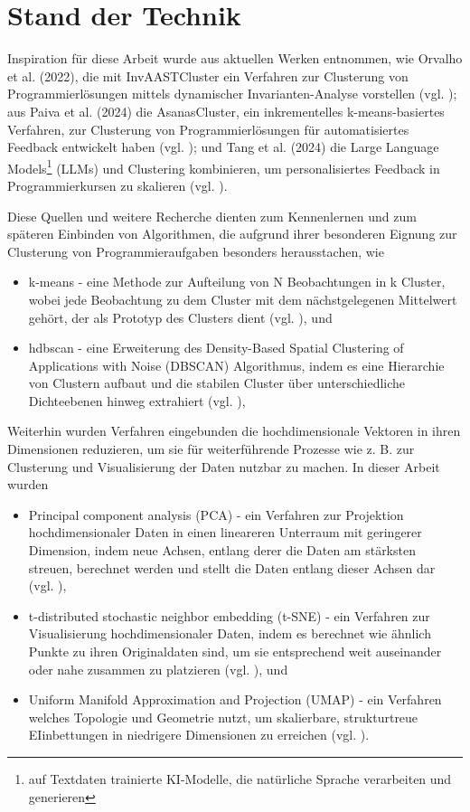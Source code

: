 \section{Stand der Technik}
Inspiration für diese Arbeit wurde aus aktuellen Werken entnommen, wie Orvalho et al. (2022), die mit InvAASTCluster ein Verfahren zur Clusterung von Programmierlösungen mittels dynamischer Invarianten-Analyse vorstellen (vgl. \cite{Orvalho.28.06.2022}); aus Paiva et al. (2024) die AsanasCluster, ein inkrementelles k-means-basiertes Verfahren, zur Clusterung von Programmierlösungen für automatisiertes Feedback entwickelt haben (vgl. \cite{Paiva.2024}); und Tang et al. (2024) die Large Language Models\footnote{auf Textdaten trainierte KI-Modelle, die natürliche Sprache verarbeiten und generieren} (LLMs) und Clustering kombinieren, um personalisiertes Feedback in Programmierkursen zu skalieren (vgl. \cite{Tang.21.10.2024}).

Diese Quellen und weitere Recherche dienten zum Kennenlernen und zum späteren Einbinden von Algorithmen, die aufgrund ihrer besonderen Eignung zur Clusterung von Programmieraufgaben besonders herausstachen, wie 
\begin{itemize}
    \item k-means - eine Methode zur Aufteilung von N Beobachtungen in k Cluster, wobei jede Beobachtung zu dem Cluster mit dem nächstgelegenen Mittelwert gehört, der als Prototyp des Clusters dient (vgl. \cite{MacQueen.1967}), und
    \item hdbscan - eine Erweiterung des Density-Based Spatial Clustering of Applications with Noise (DBSCAN) Algorithmus, indem es eine Hierarchie von Clustern aufbaut und die stabilen Cluster über unterschiedliche Dichteebenen hinweg extrahiert (vgl. \cite{CampelloRicardoJ.G.B..}),
\end{itemize}
Weiterhin wurden Verfahren eingebunden die hochdimensionale Vektoren in ihren Dimensionen reduzieren, um sie für weiterführende Prozesse wie z. B. zur Clusterung und Visualisierung der Daten nutzbar zu machen. In dieser Arbeit wurden
\begin{itemize}
    \item Principal component analysis (PCA) - ein Verfahren zur Projektion hochdimensionaler Daten in einen lineareren Unterraum mit geringerer Dimension, indem neue Achsen, entlang derer die Daten am stärksten streuen, berechnet werden und stellt die Daten entlang dieser Achsen dar (vgl. \cite{KarlPearson.1901}),
    \item t-distributed stochastic neighbor embedding (t-SNE) - ein Verfahren zur Visualisierung hochdimensionaler Daten, indem es berechnet wie ähnlich Punkte zu ihren Originaldaten sind, um sie entsprechend weit auseinander oder nahe zusammen zu platzieren (vgl. \cite{LaurensvanderMaatenundGeoffreyHinton.2008}), und
    \item Uniform Manifold Approximation and Projection (UMAP) - ein Verfahren welches Topologie und Geometrie nutzt, um skalierbare, strukturtreue EIinbettungen in niedrigere Dimensionen zu erreichen (vgl. \cite{McInnes.09.02.2018}).
\end{itemize}

